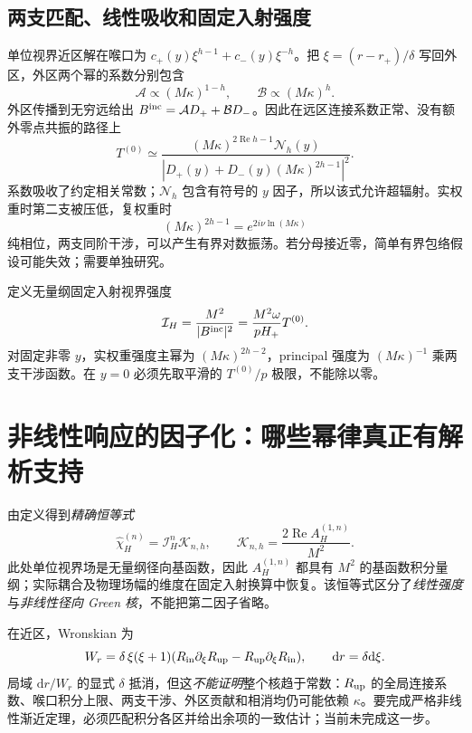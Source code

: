 \documentclass[UTF8,fontset=fandol,12pt,a4paper,oneside,openany]{ctexrep}
\newcommand{\dd}{\mathrm d}
\newcommand{\Ree}{\operatorname{Re}}
\begin{document}
\subsection{两支匹配、线性吸收和固定入射强度}
单位视界近区解在喉口为 $c_+(y)\xi^{h-1}+c_-(y)\xi^{-h}$。把 $\xi=(r-r_+)/\delta$ 写回外区，外区两个幂的系数分别包含
\begin{equation}
 \mathcal A\propto(M\kappa)^{1-h},\qquad
 \mathcal B\propto(M\kappa)^h.
\end{equation}
外区传播到无穷远给出 $B^{\rm inc}=\mathcal A D_++\mathcal B D_-$。因此在远区连接系数正常、没有额外零点共振的路径上
\begin{equation}
 T^{(0)}\simeq
 \frac{(M\kappa)^{2\Ree h-1}\mathcal N_h(y)}
 {|D_+(y)+D_-(y)(M\kappa)^{2h-1}|^2}.
\label{eq:new-matched-t0}
\end{equation}
系数吸收了约定相关常数；$\mathcal N_h$ 包含有符号的 $y$ 因子，所以该式允许超辐射。实权重时第二支被压低，复权重时
\begin{equation}
 (M\kappa)^{2h-1}=e^{2i\nu\ln(M\kappa)}
\end{equation}
纯相位，两支同阶干涉，可以产生有界对数振荡。若分母接近零，简单有界包络假设可能失效；需要单独研究。

定义无量纲固定入射视界强度
\begin{equation}
 \mathcal I_H=\frac{M^2}{|B^{\rm inc}|^2}
 =\frac{M^2\omega}{pH_+}T^{(0)}.
\end{equation}
对固定非零 $y$，实权重强度主幂为 $(M\kappa)^{2h-2}$，principal 强度为 $(M\kappa)^{-1}$ 乘两支干涉函数。在 $y=0$ 必须先取平滑的 $T^{(0)}/p$ 极限，不能除以零。

\section{非线性响应的因子化：哪些幂律真正有解析支持}
由定义得到\emph{精确恒等式}
\begin{equation}
 \boxed{\widehat\chi_H^{(n)}=\mathcal I_H^n\mathcal K_{n,h},\qquad
 \mathcal K_{n,h}=\frac{2\Ree A_H^{(1,n)}}{M^2}.}
\label{eq:new-factorization}
\end{equation}
此处单位视界场是无量纲径向基函数，因此 $A_H^{(1,\allowbreak n)}$ 都具有 $M^2$ 的基函数积分量纲；实际耦合及物理场幅的维度在固定入射换算中恢复。该恒等式区分了\emph{线性强度}与\emph{非线性径向 Green 核}，不能把第二因子省略。

在近区，Wronskian 为
\begin{equation}
 W_r=\delta\,\xi(\xi+1)
 (R_{\rm in}\partial_\xi R_{\rm up}-R_{\rm up}\partial_\xi R_{\rm in}),
 \qquad\dd r=\delta\dd\xi.
\end{equation}
局域 $\dd r/W_r$ 的显式 $\delta$ 抵消，但这\emph{不能证明}整个核趋于常数：$R_{\rm up}$ 的全局连接系数、喉口积分上限、两支干涉、外区贡献和相消均仍可能依赖 $\kappa$。要完成严格非线性渐近定理，必须匹配积分各区并给出余项的一致估计；当前未完成这一步。
\end{document}

